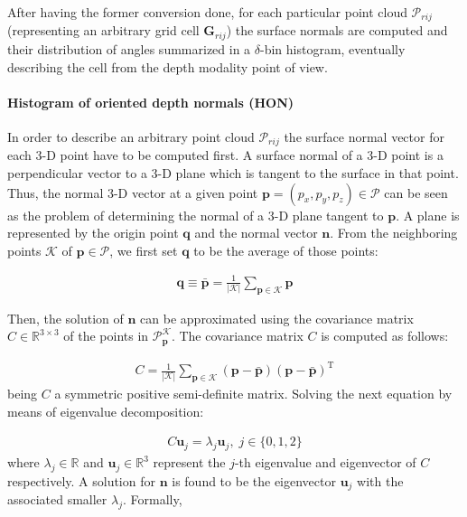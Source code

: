 \documentclass[10pt,twocolumn,letterpaper]{article}
\begin{document}
After having the former conversion done, for each particular point cloud $\mathcal{P}_{rij}$ (representing an arbitrary grid cell $\mathbf{G}_{rij}$) the surface normals are computed and their distribution of angles summarized in a $\delta$-bin histogram, eventually describing the cell from the depth modality point of view.

\paragraph{Histogram of oriented depth normals (HON)} 
In order to describe an arbitrary point cloud $\mathcal{P}_{rij}$ the surface normal vector for each 3-D point have to be computed first. A surface normal of a 3-D point is a perpendicular vector to a 3-D plane which is tangent to the surface in that point. Thus, the normal 3-D vector at a given point $\mathbf{p} = (p_x, p_y, p_z) \in \mathcal{P}$ can be seen as the problem of determining the normal of a 3-D plane tangent to $\mathbf{p}$. A plane is represented by the origin point $\mathbf{q}$ and the normal vector $\mathbf{n}$. From the neighboring points $\mathcal{K}$ of $\mathbf{p} \in \mathcal{P}$, we first set $\mathbf{q}$ to be the average of those points:

\begin{gather}
	\mathbf{q} \equiv \bar{\mathbf{p}} = \frac{1}{|\mathcal{K}|} \sum_{\mathbf{p} \in \mathcal{K}} \mathbf{p}
\end{gather}
 
Then, the solution of $\mathbf{n}$ can be approximated using the covariance matrix $C \in \mathbb{R}^{3 \times 3}$ of the points in $\mathcal{P}_\mathbf{p}^{\mathcal{K}}$. The covariance matrix $C$ is computed as follows: 

\begin{gather}
	C = \frac{1}{|\mathcal{K}|} \sum_{\mathbf{p} \in \mathcal{K}} (\mathbf{p} - \bar{\mathbf{p}}) (\mathbf{p} - \bar{\mathbf{p}})^{\mathrm{T}}
\end{gather}
being $C$ a symmetric positive semi-definite matrix. Solving the next equation by means of eigenvalue decomposition:

\begin{gather}
	C \mathbf{u}_j = \lambda_j \mathbf{u}_j, \; j \in \{0,1,2\}
\end{gather}
where $\lambda_j \in \mathbb{R}$ and $\mathbf{u}_j \in \mathbb{R}^3$ represent the $j$-th eigenvalue and eigenvector of $C$ respectively. A solution for $\mathbf{n}$ is found to be the eigenvector $\mathbf{u}_j$ with the associated smaller $\lambda_j$. Formally,
\end{document}
